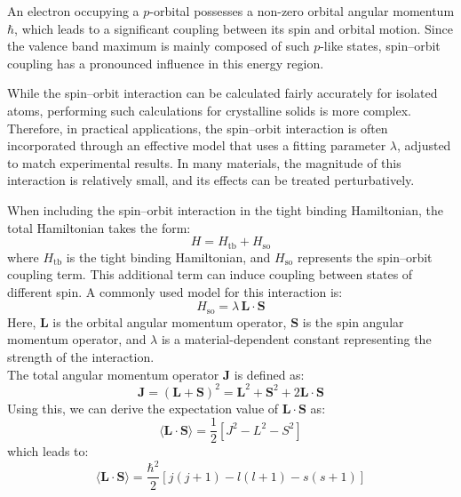 An electron occupying a \( p \)-orbital possesses a non-zero orbital angular momentum \( \hbar \), which leads to a significant coupling between its spin and orbital motion. Since the valence band maximum is mainly composed of such \( p \)-like states, spin–orbit coupling has a pronounced influence in this energy region.

While the spin–orbit interaction can be calculated fairly accurately for isolated atoms, performing such calculations for crystalline solids is more complex. Therefore, in practical applications, the spin–orbit interaction is often incorporated through an effective model that uses a fitting parameter \( \lambda \), adjusted to match experimental results. In many materials, the magnitude of this interaction is relatively small, and its effects can be treated perturbatively.

When including the spin–orbit interaction in the tight binding Hamiltonian, the total Hamiltonian takes the form:
\begin{equation}
	H = H_{\text{tb}} + H_{\text{so}}
\end{equation}
\noindent
where \( H_{\text{tb}} \) is the tight binding Hamiltonian, and \( H_{\text{so}} \) represents the spin–orbit coupling term. This additional term can induce coupling between states of different spin. A commonly used model for this interaction is:
\begin{equation*}
	H_{\text{so}} = \lambda \, \mathbf{L} \cdot \mathbf{S}
\end{equation*}
\noindent
Here, \( \mathbf{L} \) is the orbital angular momentum operator, \( \mathbf{S} \) is the spin angular momentum operator, and \( \lambda \) is a material-dependent constant representing the strength of the interaction.\\
The total angular momentum operator \( \mathbf{J} \) is defined as:
\begin{equation}
	\mathbf{J} = (\mathbf{L} + \mathbf{S})^2 = \mathbf{L}^2 + \mathbf{S}^2 + 2 \mathbf{L} \cdot \mathbf{S}
\end{equation}
\noindent
Using this, we can derive the expectation value of \( \mathbf{L} \cdot \mathbf{S} \) as:
\begin{equation*}
	\langle \mathbf{L} \cdot \mathbf{S} \rangle = \frac{1}{2} \left[ J^2 - L^2 - S^2 \right]
\end{equation*}
\noindent
which leads to:
\begin{equation}
	\langle \mathbf{L} \cdot \mathbf{S} \rangle = \frac{\hbar^2}{2} \left[ j(j + 1) - l(l + 1) - s(s + 1) \right]
\end{equation}


